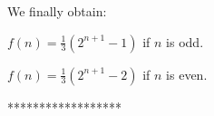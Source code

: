 {%
%
%
%
%
%

We finally obtain: 

$f(n) = \frac{1}{3} (2^{n+1} -1)$ if $n$ is odd.

$f(n) = \frac{1}{3} (2^{n+1} -2)$ if $n$ is even.

******************}
